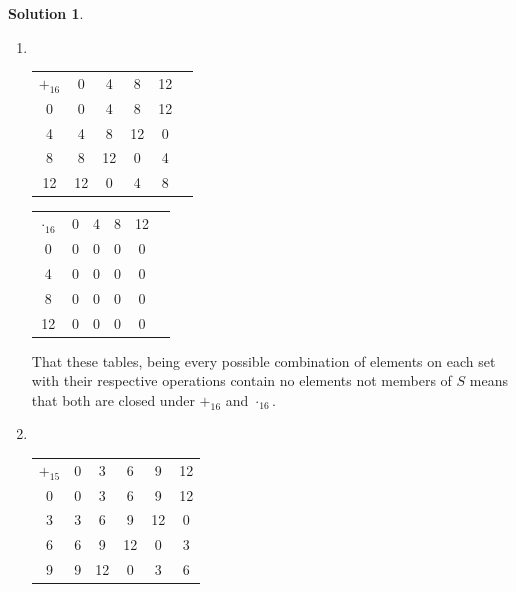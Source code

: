 \documentclass[10pt]{article}
\theoremstyle{definition}
\newtheorem{soln}{Solution}
\begin{document}
\begin{soln}~\\
  \begin{enumerate}[label=(\alph*)]
    \item ~\begin{center}
            \setlength\extrarowheight{3pt}
            \noindent\begin{tabular}{c | c c c c c}
              $+_{16}$ & 0  & 4  & 8  & 12 \\
              \cline{1-5}
              0        & 0  & 4  & 8  & 12 \\
              4        & 4  & 8  & 12 & 0  \\
              8        & 8  & 12 & 0  & 4  \\
              12       & 12 & 0  & 4  & 8  \\
            \end{tabular}
            \qquad
            \setlength\extrarowheight{3pt}
            \noindent\begin{tabular}{c | c c c c c}
              $\cdot_{16}$ & 0 & 4 & 8 & 12 \\
              \cline{1-5}
              0            & 0 & 0 & 0 & 0  \\
              4            & 0 & 0 & 0 & 0  \\
              8            & 0 & 0 & 0 & 0  \\
              12           & 0 & 0 & 0 & 0  \\
            \end{tabular}
          \end{center}
          That these tables, being every possible combination of elements on each set with their respective operations
          contain no elements not members of $S$ means that both are closed under $+_{16}$ and $\cdot_{16}$.
    \item ~\begin{center}
            \setlength\extrarowheight{3pt}
            \noindent\begin{tabular}{c | c c c c c}
              $+_{15}$ & 0  & 3  & 6  & 9  & 12 \\
              \cline{1-6}
              0        & 0  & 3  & 6  & 9  & 12 \\
              3        & 3  & 6  & 9  & 12 & 0  \\
              6        & 6  & 9  & 12 & 0  & 3  \\
              9        & 9  & 12 & 0  & 3  & 6  \\

\end{tabular}
\end{center}
\end{enumerate}
\end{soln}
\end{document}
